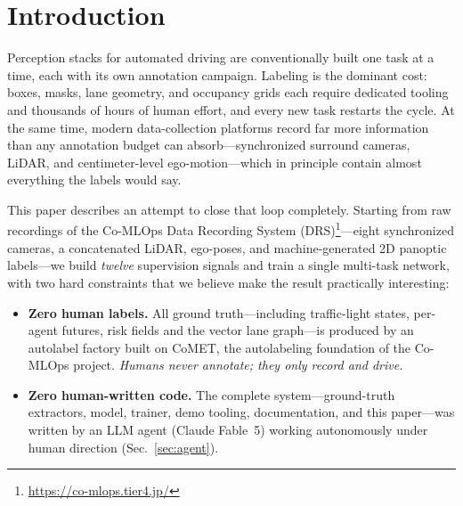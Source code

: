 \documentclass[10pt,twocolumn]{article}
\begin{document}
\section{Introduction}
Perception stacks for automated driving are conventionally built one task at a
time, each with its own annotation campaign. Labeling is the dominant cost:
boxes, masks, lane geometry, and occupancy grids each require dedicated
tooling and thousands of hours of human effort, and every new task restarts
the cycle. At the same time, modern data-collection platforms record far more
information than any annotation budget can absorb---synchronized surround
cameras, LiDAR, and centimeter-level ego-motion---which in principle contain
almost everything the labels would say.

This paper describes an attempt to close that loop completely. Starting from
raw recordings of the Co-MLOps Data Recording System
(DRS)\footnote{\url{https://co-mlops.tier4.jp/}}---eight synchronized cameras,
a concatenated LiDAR, ego-poses, and machine-generated 2D panoptic
labels---we build \emph{twelve} supervision signals and train a single
multi-task network, with two hard constraints that we believe make the result
practically interesting:

\begin{itemize}\itemsep1pt
\item \textbf{Zero human labels.} All ground truth---including traffic-light
states, per-agent futures, risk fields and the vector lane graph---is produced
by an autolabel factory built on CoMET, the autolabeling foundation of the
Co-MLOps project. \emph{Humans never annotate; they only record and drive.}
\item \textbf{Zero human-written code.} The complete system---ground-truth
extractors, model, trainer, demo tooling, documentation, and this
paper---was written by an LLM agent (Claude Fable~5) working autonomously
under human direction (Sec.~\ref{sec:agent}).
\end{itemize}
\end{document}
